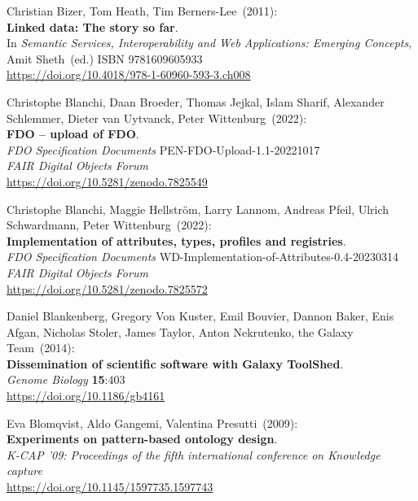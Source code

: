 \begin{thebibliography}{9}
Christian Bizer, Tom Heath, Tim Berners-Lee~(2011): \\
\textbf{Linked data: The story so far}.\\
In \emph{Semantic Services, Interoperability and Web Applications: Emerging Concepts}, Amit Sheth~(ed.) ISBN 9781609605933\\
\url{https://doi.org/10.4018/978-1-60960-593-3.ch008}

Christophe Blanchi, Daan Broeder, Thomas Jejkal, Islam Sharif, Alexander Schlemmer, Dieter van Uytvanck, Peter Wittenburg~(2022): \\
\textbf{FDO -- upload of FDO}.\\
\emph{FDO Specification Documents} PEN-FDO-Upload-1.1-20221017 \\
\emph{FAIR Digital Objects Forum}\\
\url{https://doi.org/10.5281/zenodo.7825549}

Christophe Blanchi, Maggie Hellström, Larry Lannom, Andreas Pfeil, Ulrich Schwardmann, Peter Wittenburg~(2022): \\
\textbf{Implementation of attributes, types, profiles and registries}. \\
\emph{FDO Specification Documents} WD-Implementation-of-Attributes-0.4-20230314 \\
\emph{FAIR Digital Objects Forum}\\
\url{https://doi.org/10.5281/zenodo.7825572}

Daniel Blankenberg, Gregory Von Kuster, Emil Bouvier, Dannon Baker, Enis Afgan, Nicholas Stoler, James Taylor, Anton Nekrutenko, the Galaxy Team~(2014): \\
\textbf{Dissemination of scientific software with Galaxy ToolShed}.\\
\emph{Genome Biology} \textbf{15}:403\\
\url{https://doi.org/10.1186/gb4161}

Eva Blomqvist, Aldo Gangemi, Valentina Presutti~(2009): \\
\textbf{Experiments on pattern-based ontology design}.\\
\emph{K-CAP '09: Proceedings of the fifth international conference on Knowledge capture}\\
\url{https://doi.org/10.1145/1597735.1597743}


\end{thebibliography}

